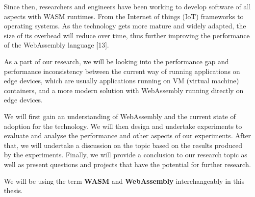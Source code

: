 Since then, researchers and engineers have been working to develop software of all aspects with WASM runtimes. From the Internet of things (IoT) frameworks to operating systems. As the technology gets more mature and widely adapted, the size of its overhead will reduce over time, thus further improving the performance of the WebAssembly language [13].

As a part of our research, we will be looking into the performance gap and performance inconsistency between the current way of running applications on edge devices, which are usually applications running on VM (virtual machine) containers, and a more modern solution with WebAssembly running directly on edge devices.

We will first gain an understanding of WebAssembly and the current state of adoption for the technology. We will then design and undertake experiments to evaluate and analyse the performance and other aspects of our experiments. After that, we will undertake a discussion on the topic based on the results produced by the experiments. Finally, we will provide a conclusion to our research topic as well as present questions and projects that have the potential for further research.

\bigskip

We will be using the term \textbf{WASM} and \textbf{WebAssembly} interchangeably in this thesis.
